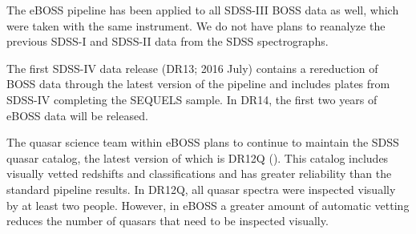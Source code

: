 The eBOSS pipeline has been applied to all SDSS-III BOSS data as well,
which were taken with the same instrument. We do not have plans to
reanalyze the previous SDSS-I and SDSS-II data from the SDSS
spectrographs.

The first SDSS-IV data release (DR13; 2016 July) contains a
rereduction of BOSS data through the latest version of the pipeline
and includes plates from SDSS-IV completing the SEQUELS sample. In
DR14, the first two years of eBOSS data will be released.

The quasar science team within eBOSS plans to continue to maintain the
SDSS quasar catalog, the latest version of which is DR12Q
(\citealt{paris14a}). This catalog includes visually vetted redshifts
and classifications and has greater reliability than the standard
pipeline results. In DR12Q, all quasar spectra were inspected visually
by at least two people. However, in eBOSS a greater amount of
automatic vetting reduces the number of quasars that need to be
inspected visually.

